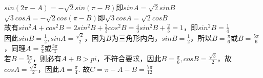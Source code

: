 \begin{enumerate}
\begin{enumerate}
        \begin{jieda}
            $sin(2\pi - A) = -\sqrt{2}sin(\pi - B)$即$sinA =\sqrt{2}sinB$ \\
            $\sqrt{3}cosA = -\sqrt{2}cos(\pi - B)$即$\sqrt{3}cosA = \sqrt{2}cosB$ \\
            故有$sin^2A + cos^2B = 2sin^2B + \frac{2}{3}cos^2B = \frac{4}{3}sin^2B + \frac{2}{3} = 1$，即$sin^2B = \frac{1}{4}$ \\
            因此$sinB = \frac{1}{2}, sinA = \frac{\sqrt{2}}{2}$，因为$B$为三角形内角，$sinB = \frac{1}{2}$，所以$B = \frac{\pi}{6}$或$B = \frac{5\pi}{6}$，同理$A = \frac{\pi}{4}$或$\frac{3\pi}{4}$ \\
            若$B = \frac{5\pi}{6}$，则必有$A+B > pi$，不符合要求，因此$B = \frac{\pi}{6}, cosB = \frac{\sqrt{3}}{2}$，故$cosA = \frac{\sqrt{2}}{2}$，因此$A = \frac{\pi}{4}$. 故$C = \pi - A - B = \frac{7\pi}{12}$
        \end{jieda}
    \end{enumerate}
\end{enumerate}
